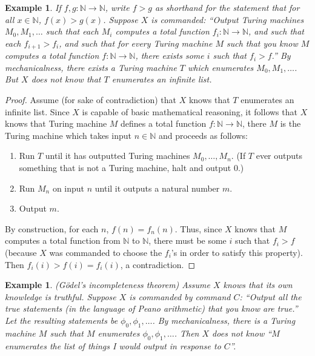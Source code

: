 \documentclass{article}
\newtheorem{example}[theorem]{Example}
\begin{document}
\begin{example}
\label{counterintuitiveexample1}
    If $f,g:\mathbb N\to\mathbb N$, write $f>g$ as shorthand for the statement that
    for all $x\in\mathbb N$, $f(x)>g(x)$.
    Suppose $X$ is commanded: ``Output Turing machines $M_0,M_1,\ldots$
    such that each $M_i$ computes a total function $f_i:\mathbb N\to\mathbb N$,
    and such that each $f_{i+1}>f_i$, and such that for every Turing machine $M$
    such that you know $M$ computes a total function $f:\mathbb N\to\mathbb N$,
    there exists some $i$ such that $f_i>f$.'' By \emph{mechanicalness}, there
    exists a Turing machine $T$ which enumerates $M_0,M_1,\ldots$.
    But $X$ does not know that $T$ enumerates an infinite list.
\end{example}

\begin{proof}
    Assume (for sake of contradiction) that $X$ knows that $T$ enumerates an
    infinite list. Since $X$ is capable of basic mathematical reasoning, it follows
    that $X$ knows that Turing machine $M$ defines a total function $f:\mathbb N\to\mathbb N$,
    there $M$ is the Turing machine which takes input $n\in\mathbb N$ and proceeds as
    follows:
    \begin{enumerate}
        \item
        Run $T$ until it has outputted Turing machines $M_0,\ldots,M_n$. (If $T$
        ever outputs something that is not a Turing machine, halt and output $0$.)
        \item
        Run $M_n$ on input $n$ until it outputs a natural number $m$.
        \item
        Output $m$.
    \end{enumerate}
    By construction, for each $n$, $f(n)=f_n(n)$. Thus, since $X$ knows that
    $M$ computes a total function from $\mathbb N$ to $\mathbb N$, there must
    be some $i$ such that $f_i>f$ (because $X$ was commanded to choose the $f_i$'s
    in order to satisfy this property). Then $f_i(i)>f(i)=f_i(i)$, a contradiction.
\end{proof}

\begin{example}
\label{counterintuitiveexample2}
    (G\"odel's incompleteness theorem)
    Assume $X$ knows that its own knowledge is truthful.
    Suppose $X$ is commanded by command $C$:
    ``Output all the true statements (in the language of
    Peano arithmetic) that you know are true.'' Let the resulting statements be
    $\phi_0,\phi_1,\ldots$. By \emph{mechanicalness}, there is a Turing machine $M$
    such that $M$ enumerates $\phi_0,\phi_1,\ldots$. Then $X$ does not know
    ``$M$ enumerates the list of things I would output in response to $C$''.
\end{example}
\end{document}
